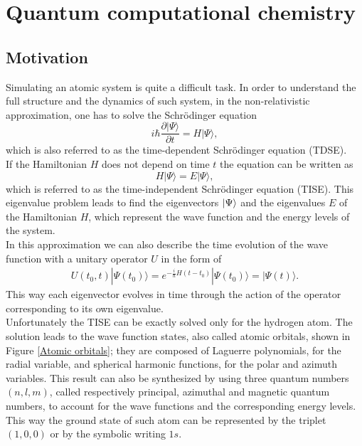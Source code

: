 \chapter{Quantum computational chemistry} \label{Quantum computational chemistry}

\section{Motivation}
Simulating an atomic system is quite a difficult task. In order to understand the full structure and the dynamics of such system, in the non-relativistic approximation, one has to solve the Schrödinger equation
\begin{equation}
    i\hbar\frac{\partial |\Psi\rangle}{\partial t} = H|\Psi\rangle,
\end{equation}
which is also referred to as the time-dependent Schrödinger equation (TDSE). \\
If the Hamiltonian $H$ does not depend on time $t$ the equation can be written as
\begin{equation}
    H |\Psi\rangle = E |\Psi\rangle,
\end{equation}
which is referred to as the time-independent Schrödinger equation (TISE).
This eigenvalue problem leads to find the eigenvectors $\ket{\Psi}$ and the eigenvalues $E$ of the Hamiltonian $H$, which represent the wave function and the energy levels of the system. \\
In this approximation we can also describe the time evolution of the wave function with a unitary operator $U$ in the form of
\begin{equation}\begin{split}
U(t_0,t) |\Psi(t_0)\rangle = e^{-\frac{i}{\hbar}H (t-t_0)} |\Psi(t_0)\rangle = |\Psi(t)\rangle.
\end{split}\end{equation}
This way each eigenvector evolves in time through the action of the operator corresponding to its own eigenvalue. \\
Unfortunately the TISE can be exactly solved only for the hydrogen atom. The solution leads to the wave function states, also called atomic orbitals, shown in Figure \ref{Atomic orbitals}; they are composed of Laguerre polynomials, for the radial variable, and spherical harmonic functions, for the polar and azimuth variables. This result can also be synthesized by using three quantum numbers $(n, l, m)$, called respectively principal, azimuthal and magnetic quantum numbers, to account for the wave functions and the corresponding energy levels. This way the ground state of such atom can be represented by the triplet $(1,0,0)$ or by the symbolic writing $1s$.
